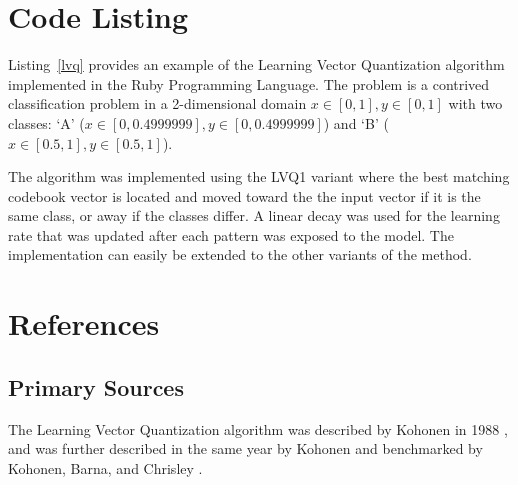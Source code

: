 \documentclass[a4paper, 11pt]{article}
\begin{document}
\section{Code Listing}
\label{sec:code}
Listing~\ref{lvq} provides an example of the Learning Vector Quantization algorithm implemented in the Ruby Programming Language. 
The problem is a contrived classification problem in a 2-dimensional domain $x\in[0,1], y\in[0,1]$ with two classes: `A' ($x\in[0,0.4999999], y\in[0,0.4999999]$) and `B' ($x\in[0.5,1], y\in[0.5,1]$).

The algorithm was implemented using the LVQ1 variant where the best matching codebook vector is located and moved toward the the input vector if it is the same class, or away if the classes differ. A linear decay was used for the learning rate that was updated after each pattern was exposed to the model. The implementation can easily be extended to the other variants of the method.




\section{References}
\label{sec:references}

% 
% 
\subsection{Primary Sources}
The Learning Vector Quantization algorithm was described by Kohonen in 1988 \cite{Kohonen1988}, and was further described in the same year by Kohonen \cite{Kohonen1988a} and benchmarked by Kohonen, Barna, and Chrisley \cite{Kohonen1988b}.
\end{document}

